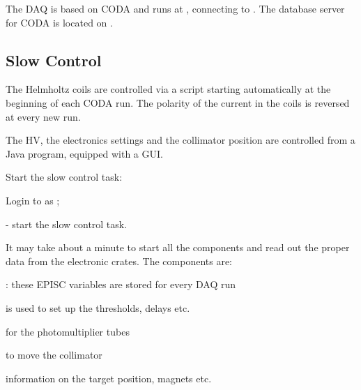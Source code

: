 {The DAQ%
 is based on CODA\cite{CODAwww} and runs at ,
connecting to . The database server for CODA
is located on . 

\subsection {Slow Control}
\label{sec:moller_compon_slow}

The Helmholtz coils are controlled via a script starting automatically
at the beginning of each CODA run. The polarity of the current in the coils
is reversed at every new run.

The HV, the electronics settings and the collimator position
are controlled from a Java program, equipped with a GUI.

 Start the slow control task:
 \begin{list}{--}{\setlength{\itemsep}{-0.15cm}}
   \item Login to  as ;
   \item {}
   \item {} - start the slow control task.
 \end{list}
 It may take about a minute to start all the components and read out
 the proper data from the electronic crates.
 The components are: 
 \begin{list}{--}{\setlength{\itemsep}{-0.15cm}}
   \item {}: these EPISC variables are stored for every DAQ run
   \item {} is used to set up the thresholds, delays etc.
   \item {} for the photomultiplier tubes
   \item {} to move the collimator
   \item {} information on the target position, magnets etc.
 \end{list}
\infolevtwo{

}}
